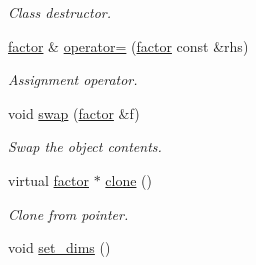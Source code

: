 \begin{DoxyCompactItemize}
\begin{DoxyCompactList}\small\item\em Class destructor. \end{DoxyCompactList}\item 
\hyperlink{classmerlin_1_1factor}{factor} \& \hyperlink{classmerlin_1_1factor_a5bb09d09b5141777be8bbf210b071516}{operator=} (\hyperlink{classmerlin_1_1factor}{factor} const \&rhs)
\begin{DoxyCompactList}\small\item\em Assignment operator. \end{DoxyCompactList}\item 
void \hyperlink{classmerlin_1_1factor_abeb2ea39caa01ef6b94b9e796484b78a}{swap} (\hyperlink{classmerlin_1_1factor}{factor} \&f)
\begin{DoxyCompactList}\small\item\em Swap the object contents. \end{DoxyCompactList}\item 
virtual \hyperlink{classmerlin_1_1factor}{factor} $\ast$ \hyperlink{classmerlin_1_1factor_a789b7a448eda0c25be234fed47ca5b95}{clone} ()
\begin{DoxyCompactList}\small\item\em Clone from pointer. \end{DoxyCompactList}\item 
\hypertarget{classmerlin_1_1factor_a94727058eaffbe0a7a3e6dceb4b44498}{}void \hyperlink{classmerlin_1_1factor_a94727058eaffbe0a7a3e6dceb4b44498}{set\+\_\+dims} ()\label{classmerlin_1_1factor_a94727058eaffbe0a7a3e6dceb4b44498}


\end{DoxyCompactItemize}
